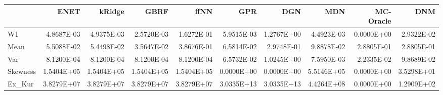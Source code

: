 \begin{tabular}{lrrrrrrrrr}
\toprule
{} &       ENET &     kRidge &       GBRF &       ffNN &        GPR &        DGN &        MDN &  MC-Oracle &        DNM \\
\midrule
W1       & 4.8687E-03 & 4.9375E-03 & 2.5720E-03 & 1.6272E-01 & 5.9515E-03 & 1.2767E+00 & 4.4923E-03 & 0.0000E+00 & 2.9322E-02 \\
Mean     & 5.5088E-02 & 5.4498E-02 & 3.5647E-02 & 3.8676E-01 & 6.5814E-02 & 2.9748E-01 & 9.8878E-02 & 2.8805E-01 & 2.8805E-01 \\
Var      & 8.1200E-04 & 8.1200E-04 & 8.1200E-04 & 8.1200E-04 & 6.5732E-02 & 1.0245E+00 & 7.5950E-03 & 2.2335E-02 & 9.8689E-02 \\
Skewness & 1.5404E+05 & 1.5404E+05 & 1.5404E+05 & 1.5404E+05 & 0.0000E+00 & 0.0000E+00 & 5.5146E+05 & 0.0000E+00 & 3.5298E+01 \\
Ex\_Kur   & 3.8279E+07 & 3.8279E+07 & 3.8279E+07 & 3.8279E+07 & 3.0335E+13 & 3.0335E+13 & 4.4264E+08 & 0.0000E+00 & 1.2909E+02 \\
\bottomrule
\end{tabular}
